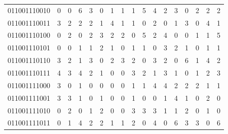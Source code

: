 \documentclass[10pt,a4paper]{article}
\begin{document}
\begin{longtable}{ |c|c|c|c|c|c|c|c|c|c|c|c|c|c|c|c|c| }
    011001110010              & 0                            & 0                                & 6                            & 3                              & 0   & 1   & 1   & 1   & 5   & 4   & 2   & 3   & 0   & 2   & 2   & 2   \\
    011001110011              & 3                            & 2                                & 2                            & 2                              & 1   & 4   & 1   & 1   & 0   & 2   & 0   & 1   & 3   & 0   & 4   & 1   \\
    011001110100              & 0                            & 2                                & 0                            & 2                              & 3   & 2   & 2   & 0   & 5   & 2   & 4   & 0   & 0   & 1   & 1   & 5   \\
    011001110101              & 0                            & 0                                & 1                            & 1                              & 2   & 1   & 0   & 1   & 1   & 0   & 3   & 2   & 1   & 0   & 1   & 1   \\
    011001110110              & 3                            & 2                                & 1                            & 3                              & 0   & 2   & 3   & 2   & 0   & 3   & 2   & 0   & 6   & 1   & 4   & 2   \\
    011001110111              & 4                            & 3                                & 4                            & 2                              & 1   & 0   & 0   & 3   & 2   & 1   & 3   & 1   & 0   & 1   & 2   & 3   \\
    011001111000              & 3                            & 0                                & 1                            & 0                              & 0   & 0   & 0   & 1   & 1   & 4   & 4   & 2   & 2   & 2   & 1   & 1   \\
    011001111001              & 3                            & 3                                & 1                            & 0                              & 1   & 0   & 0   & 1   & 0   & 0   & 1   & 4   & 1   & 0   & 2   & 0   \\
    011001111010              & 0                            & 2                                & 0                            & 1                              & 2   & 0   & 0   & 3   & 3   & 3   & 1   & 1   & 2   & 0   & 1   & 0   \\
    011001111011              & 0                            & 1                                & 4                            & 2                              & 2   & 1   & 1   & 2   & 0   & 4   & 0   & 6   & 3   & 3   & 0   & 6   \\

\end{longtable}
\end{document}
